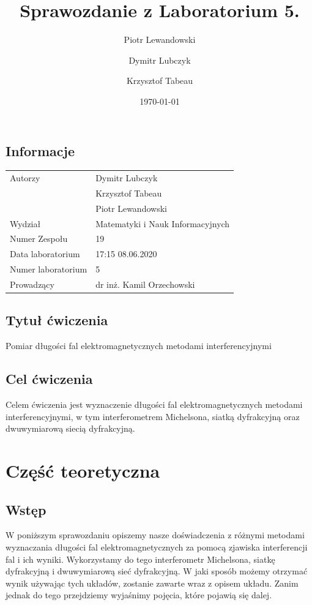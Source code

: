 \documentclass{article}
\title{Sprawozdanie z Laboratorium 5.}
\author{Piotr Lewandowski \and Dymitr Lubczyk \and Krzysztof Tabeau }
\date{\today}
\begin{document}
\maketitle
\subsection{Informacje}
\begin{tabular}{|l|l|}
\hline
Autorzy             & Dymitr Lubczyk                    \\
                    & Krzysztof Tabeau                  \\
                    & Piotr Lewandowski                 \\
Wydział             & Matematyki i Nauk Informacyjnych  \\
Numer Zespołu       & 19                                \\
Data laboratorium   & 17:15 08.06.2020                  \\
Numer laboratorium  & 5                                 \\
Prowadzący          & dr inż. Kamil Orzechowski         \\
\hline
\end{tabular}
\subsection{Tytuł ćwiczenia}
Pomiar długości fal elektromagnetycznych metodami interferencyjnymi
\subsection{Cel ćwiczenia}
Celem ćwiczenia jest wyznaczenie długości fal elektromagnetycznych metodami interferencyjnymi, w tym interferometrem Michelsona, siatką dyfrakcyjną oraz dwuwymiarową siecią dyfrakcyjną.
\clearpage

\section{Część teoretyczna}

\subsection{Wstęp}
W poniższym sprawozdaniu opiszemy nasze doświadczenia z różnymi metodami wyznaczania długości fal elektromagnetycznych za pomocą zjawiska interferencji fal i ich wyniki. Wykorzystamy do tego interferometr Michelsona, siatkę dyfrakcyjną i dwuwymiarową sieć dyfrakcyjną. W jaki sposób możemy otrzymać wynik używając tych układów, zostanie zawarte wraz z opisem układu. Zanim jednak do tego przejdziemy wyjaśnimy pojęcia, które pojawią się dalej.
\end{document}
